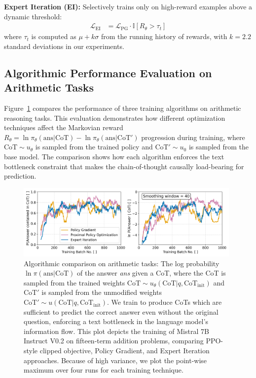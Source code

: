 \documentclass{article} %
\begin{document}
\textbf{Expert Iteration (EI):} Selectively trains only on high-reward examples above a dynamic threshold:
\begin{align}
\mathcal{L}_{\text{EI}} &= \mathcal{L}_{\text{PG}} \cdot \mathbb{I}[R_\theta > \tau_t]
\end{align}
where $\tau_t$ is computed as $\mu + k\sigma$ from the running history of rewards, with $k = 2.2$ standard deviations in our experiments.

\subsection{Algorithmic Performance Evaluation on Arithmetic Tasks}
Figure~\ref{fig:cot_arithmetic_performance} compares the performance of three training algorithms on arithmetic reasoning tasks. This evaluation demonstrates how different optimization techniques affect the Markovian reward $R_\theta = \ln \pi_\theta(\text{ans} | \text{CoT}) - \ln \pi_\theta(\text{ans} | \text{CoT}')$ progression during training, where $\text{CoT} \sim u_\theta$ is sampled from the trained policy and $\text{CoT}' \sim u_0$ is sampled from the base model. The comparison shows how each algorithm enforces the text bottleneck constraint that makes the chain-of-thought causally load-bearing for prediction.

\begin{figure}[ht]
    \centering
    \includegraphics[width=0.98\textwidth]{Figures/cot_performance_comparison.png}
    \caption{Algorithmic comparison on arithmetic tasks: The log probability $\ln \pi(\text{ans} | \text{CoT})$ of the answer \textit{ans} given a CoT, where the CoT is sampled from the trained weights $\text{CoT} \sim u_\theta(\text{CoT} | q, \text{CoT}_{\text{init}})$ and $\text{CoT}'$ is sampled from the unmodified weights $\text{CoT}' \sim u(\text{CoT} | q, \text{CoT}_{\text{init}})$. We train to produce CoTs which are sufficient to predict the correct answer even without the original question, enforcing a text bottleneck in the language model's information flow. This plot depicts the training of Mistral 7B Instruct V0.2 on fifteen-term addition problems, comparing PPO-style clipped objective, Policy Gradient, and Expert Iteration approaches. Because of high variance, we plot the point-wise maximum over four runs for each training technique.}
    \label{fig:cot_arithmetic_performance}
\end{figure}
\end{document}
